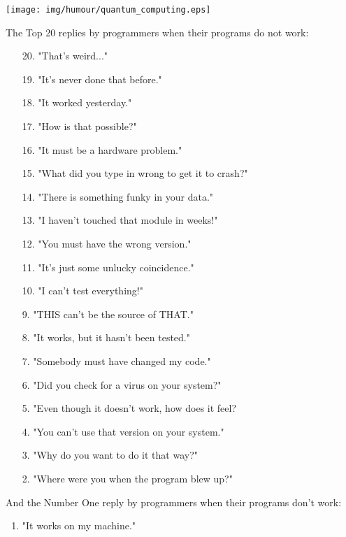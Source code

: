 	\begin{center}
	\texttt{[image: img/humour/quantum\_computing.eps]}
	\end{center}
\begin{center}\underline{\hspace{5 cm}}\end{center}

The Top 20 replies by programmers when their programs do not work:
	\begin{enumerate}[nolistsep]
		\item[20.] "That's weird..."
		\item[19.] "It's never done that before."
		\item[18.] "It worked yesterday."
		\item[17.] "How is that possible?"
		\item[16.] "It must be a hardware problem."
		\item[15.] "What did you type in wrong to get it to crash?"
		\item[14.] "There is something funky in your data."
		\item[13.] "I haven't touched that module in weeks!"
		\item[12.] "You must have the wrong version."
		\item[11.] "It's just some unlucky coincidence."
		\item[10.] "I can't test everything!"
		\item[9.] "THIS can't be the source of THAT."
		\item[8.] "It works, but it hasn't been tested."
		\item[7.] "Somebody must have changed my code."
		\item[6.] "Did you check for a virus on your system?"
		\item[5.] "Even though it doesn't work, how does it feel?
		\item[4.] "You can't use that version on your system."
		\item[3.] "Why do you want to do it that way?"
		\item[2.] "Where were you when the program blew up?"
	\end{enumerate}

	And the Number One reply by programmers when their programs don't work:
	\begin{enumerate}
		\item "It works on my machine."		
	\end{enumerate}


